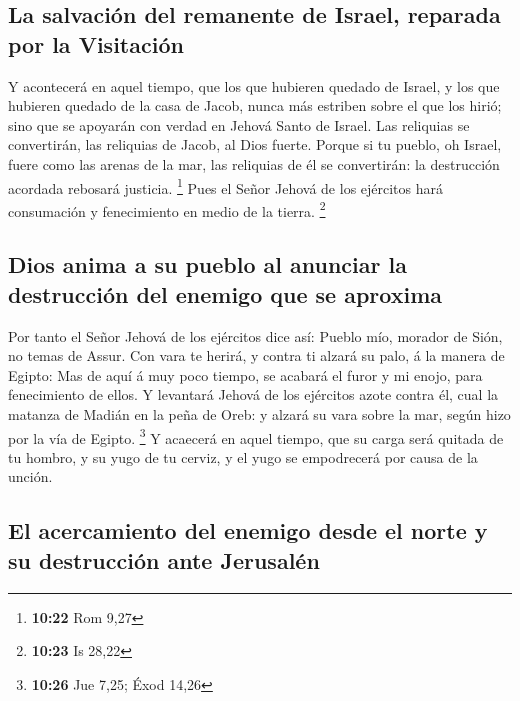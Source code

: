 \hypertarget{la-salvaciuxf3n-del-remanente-de-israel-reparada-por-la-visitaciuxf3n}{%
\subsection{La salvación del remanente de Israel, reparada por la
Visitación}\label{la-salvaciuxf3n-del-remanente-de-israel-reparada-por-la-visitaciuxf3n}}

 Y acontecerá en aquel tiempo, que los que hubieren
quedado de Israel, y los que hubieren quedado de la casa de Jacob, nunca
más estriben sobre el que los hirió; sino que se apoyarán con verdad en
Jehová Santo de Israel.  Las reliquias se convertirán,
las reliquias de Jacob, al Dios fuerte.  Porque si tu
pueblo, oh Israel, fuere como las arenas de la mar, las reliquias de él
se convertirán: la destrucción acordada rebosará justicia. \footnote{\textbf{10:22}
  Rom 9,27}  Pues el Señor Jehová de los ejércitos hará
consumación y fenecimiento en medio de la tierra. \footnote{\textbf{10:23}
  Is 28,22}

\hypertarget{dios-anima-a-su-pueblo-al-anunciar-la-destrucciuxf3n-del-enemigo-que-se-aproxima}{%
\subsection{Dios anima a su pueblo al anunciar la destrucción del
enemigo que se
aproxima}\label{dios-anima-a-su-pueblo-al-anunciar-la-destrucciuxf3n-del-enemigo-que-se-aproxima}}

 Por tanto el Señor Jehová de los ejércitos dice así:
Pueblo mío, morador de Sión, no temas de Assur. Con vara te herirá, y
contra ti alzará su palo, á la manera de Egipto:  Mas de
aquí á muy poco tiempo, se acabará el furor y mi enojo, para
fenecimiento de ellos.  Y levantará Jehová de los
ejércitos azote contra él, cual la matanza de Madián en la peña de Oreb:
y alzará su vara sobre la mar, según hizo por la vía de Egipto.
\footnote{\textbf{10:26} Jue 7,25; Éxod 14,26}  Y
acaecerá en aquel tiempo, que su carga será quitada de tu hombro, y su
yugo de tu cerviz, y el yugo se empodrecerá por causa de la unción.

\hypertarget{el-acercamiento-del-enemigo-desde-el-norte-y-su-destrucciuxf3n-ante-jerusaluxe9n}{%
\subsection{El acercamiento del enemigo desde el norte y su destrucción
ante
Jerusalén}\label{el-acercamiento-del-enemigo-desde-el-norte-y-su-destrucciuxf3n-ante-jerusaluxe9n}}

